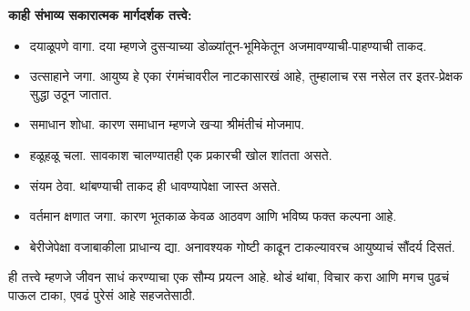 \textbf{काही संभाव्य सकारात्मक मार्गदर्शक तत्त्वे:}
\begin{itemize}
\item दयाळूपणे वागा. दया म्हणजे दुसऱ्याच्या डोळ्यांतून-भूमिकेतून अजमावण्याची-पाहण्याची ताकद.
\item उत्साहाने जगा. आयुष्य हे एका रंगमंचावरील नाटकासारखं आहे, तुम्हालाच रस नसेल तर इतर-प्रेक्षक सुद्धा उठून जातात.
\item समाधान शोधा. कारण समाधान म्हणजे खऱ्या श्रीमंतीचं मोजमाप.
\item हळूहळू चला. सावकाश चालण्यातही एक प्रकारची खोल शांतता असते.
\item संयम ठेवा. थांबण्याची ताकद ही धावण्यापेक्षा जास्त असते.
\item वर्तमान क्षणात जगा. कारण भूतकाळ केवळ आठवण आणि भविष्य फक्त कल्पना आहे.
\item बेरीजेपेक्षा वजाबाकीला प्राधान्य द्या. अनावश्यक गोष्टी काढून टाकल्यावरच आयुष्याचं सौंदर्य दिसतं.
\end{itemize}

ही तत्त्वे म्हणजे जीवन साधं करण्याचा एक सौम्य प्रयत्न आहे. थोडं थांबा, विचार करा आणि मगच पुढचं पाऊल टाका, एवढं पुरेसं आहे सहजतेसाठी.

